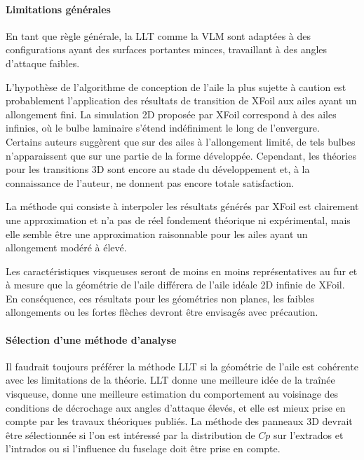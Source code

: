 \documentclass[a4paper,twoside,12pt,dvips]{article}
\begin{document}
\paragraph{Limitations générales}
En tant que règle générale, la LLT comme la VLM sont adaptées à des
configurations ayant des surfaces portantes minces, travaillant à des angles
d’attaque faibles.

L’hypothèse de l’algorithme de conception de l’aile la plus sujette à caution est probablement l’application des résultats de transition de XFoil aux ailes ayant un allongement fini. La simulation 2D proposée par XFoil correspond à des ailes infinies, où le bulbe laminaire s’étend indéfiniment le long de l’envergure. Certains auteurs suggèrent que sur des ailes à l’allongement limité, de tels bulbes n’apparaissent que sur une partie de la forme développée. Cependant, les théories pour les transitions 3D sont encore au stade du développement et, à la connaissance de l’auteur, ne donnent pas encore totale satisfaction.

La méthode qui consiste à interpoler les résultats générés par XFoil est clairement une approximation et n’a pas de réel fondement théorique ni expérimental, mais elle semble être une approximation raisonnable pour les ailes ayant un allongement modéré à élevé.

Les caractéristiques visqueuses seront de moins en moins représentatives au 
fur et à mesure que  la géométrie de l’aile différera de l’aile idéale 2D infinie de XFoil. En conséquence, ces résultats pour les géométries non planes, les faibles allongements ou les fortes flèches devront être envisagés avec précaution. 

\clearpage 

\paragraph{Sélection d’une méthode d’analyse}

Il faudrait toujours préférer la méthode LLT si la géométrie de l’aile est cohérente avec les limitations de la théorie. LLT donne une meilleure idée de la traînée visqueuse, donne une meilleure estimation du comportement au voisinage des conditions de décrochage aux angles d’attaque élevés, et elle est mieux prise en compte par les travaux théoriques publiés. La méthode des panneaux 3D devrait être sélectionnée si l’on est intéressé par la distribution de $Cp$ sur l’extrados et l’intrados ou si l’influence du fuselage doit être prise en compte.
\end{document}
